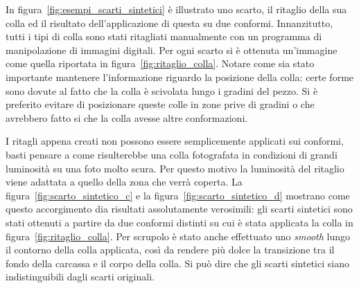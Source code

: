 In figura~\ref{fig:esempi_scarti_sintetici} è illustrato uno scarto, il ritaglio della sua colla ed il risultato dell'applicazione di questa su due conformi.
Innanzitutto, tutti i tipi di colla sono stati ritagliati manualmente con un programma di manipolazione di immagini digitali.
Per ogni scarto si è ottenuta un'immagine come quella riportata in figura~\ref{fig:ritaglio_colla}.
Notare come sia stato importante mantenere l'informazione riguardo la posizione della colla:
certe forme sono dovute al fatto che la colla è scivolata lungo i gradini del pezzo.
Si è preferito evitare di posizionare queste colle in zone prive di gradini o che avrebbero fatto si che la colla avesse altre conformazioni. %

I ritagli appena creati non possono essere semplicemente applicati  sui conformi, basti pensare a come risulterebbe una colla fotografata in condizioni di grandi luminosità su una foto molto scura.
Per questo motivo la luminosità del ritaglio viene adattata a quello della zona che verrà coperta.
La figura~\ref{fig:scarto_sintetico_c} e la figura~\ref{fig:scarto_sintetico_d} mostrano come questo accorgimento dia risultati assolutamente verosimili: gli scarti sintetici sono stati ottenuti a partire da due conformi distinti su cui è stata applicata la colla in figura~\ref{fig:ritaglio_colla}.
Per scrupolo è stato anche effettuato uno \textit{smooth} lungo il contorno della colla applicata, così da rendere più dolce la transizione tra il fondo della carcassa e il corpo della colla.
Si può dire che gli scarti sintetici siano indistinguibili dagli scarti originali.



